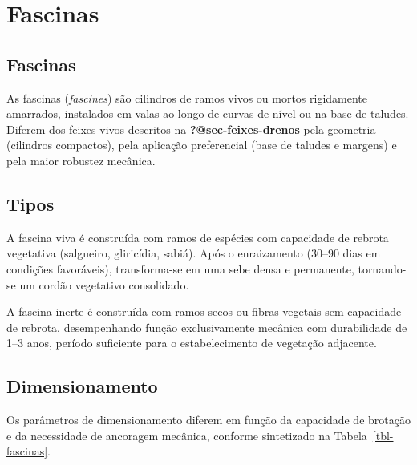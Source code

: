 \documentclass[
  portuguese,
  11pt,
  a4paper,
  open=any]{scrbook}
\begin{document}
\section{Fascinas}\label{fascinas}

\subsection{Fascinas}\label{fascinas-1}

As fascinas (\emph{fascines}) são cilindros de ramos vivos ou mortos
rigidamente amarrados, instalados em valas ao longo de curvas de nível
ou na base de taludes. Diferem dos feixes vivos descritos na
\textbf{?@sec-feixes-drenos} pela geometria (cilindros compactos), pela
aplicação preferencial (base de taludes e margens) e pela maior robustez
mecânica.

\subsection{Tipos}\label{tipos-1}

A fascina viva é construída com ramos de espécies com capacidade de
rebrota vegetativa (salgueiro, gliricídia, sabiá). Após o enraizamento
(30--90 dias em condições favoráveis), transforma-se em uma sebe densa e
permanente, tornando-se um cordão vegetativo consolidado.

A fascina inerte é construída com ramos secos ou fibras vegetais sem
capacidade de rebrota, desempenhando função exclusivamente mecânica com
durabilidade de 1--3 anos, período suficiente para o estabelecimento de
vegetação adjacente.

\subsection{Dimensionamento}\label{dimensionamento-5}

Os parâmetros de dimensionamento diferem em função da capacidade de
brotação e da necessidade de ancoragem mecânica, conforme sintetizado na
Tabela~\ref{tbl-fascinas}.
\end{document}
